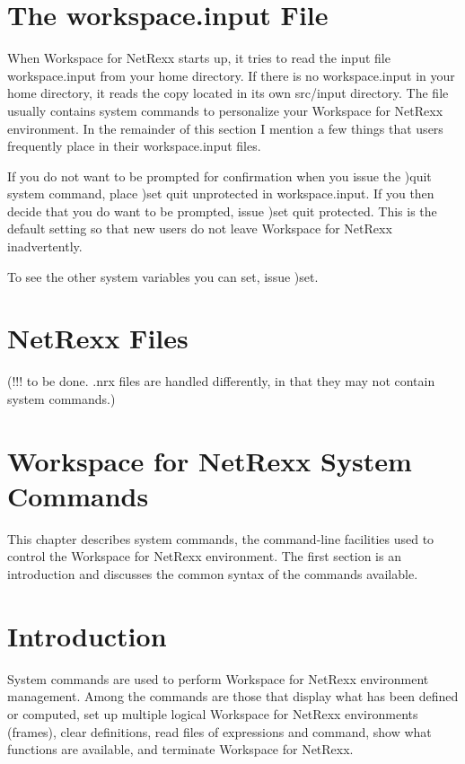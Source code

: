 \section{The workspace.input File}

When Workspace for NetRexx starts up, it tries to read the input file workspace.input from your home directory. If there is no workspace.input in your home directory, it reads the copy located in its own src/input directory. The file usually contains system commands to personalize your Workspace for NetRexx environment. In the remainder of this section I mention a few things that users frequently place in their workspace.input files.

If you do not want to be prompted for confirmation when you issue the )quit system command, place )set quit unprotected in workspace.input. If you then decide that you do want to be prompted, issue )set quit protected. This is the default setting so that new users do not leave Workspace for NetRexx inadvertently.

To see the other system variables you can set, issue )set.

\section{NetRexx Files}

(!!! to be done. .nrx files are handled differently, in that they may not contain system commands.)

\section{Workspace for NetRexx System Commands}

This chapter describes system commands, the command-line facilities used to control the Workspace for NetRexx environment. The first section is an introduction and discusses the common syntax of the commands available.

\section{Introduction}

System commands are used to perform Workspace for NetRexx environment management. Among the commands are those that display what has been defined or computed, set up multiple logical Workspace for NetRexx environments (frames), clear definitions, read files of expressions and command, show what functions are available, and terminate Workspace for NetRexx.

